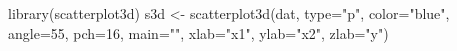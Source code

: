\begin{Schunk}
\begin{Sinput}
 library(scatterplot3d)
 s3d <- scatterplot3d(dat, type="p", color="blue", angle=55, pch=16, main="", xlab="x1", ylab="x2", zlab="y")
\end{Sinput}
\end{Schunk}
